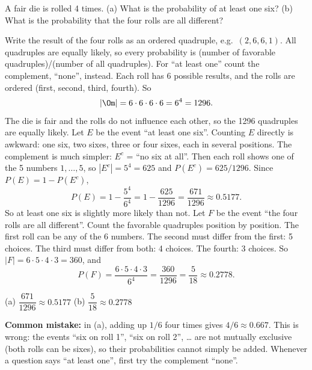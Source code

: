 
\begin{problem}
	A fair die is rolled 4 times. (a) What is the probability of at least one
	six? (b) What is the probability that the four rolls are all different?
\end{problem}

\begin{solution}
	\idea Write the result of the four rolls as an ordered quadruple, e.g.\
	$(2,6,6,1)$. All quadruples are equally likely, so every probability is
	(number of favorable quadruples)/(number of all quadruples). For ``at least
	one'' count the complement, ``none'', instead.
	 Each roll has 6 possible results, and the rolls are
	ordered (first, second, third, fourth). So
	\[ |\Om|=6\cdot6\cdot6\cdot6=6^4=1296. \]
	The die is fair and the rolls do not influence each other, so the 1296
	quadruples are equally likely.
	 Let $E$ be the event ``at least one six''. Counting $E$ directly
	is awkward: one six, two sixes, three or four sixes, each in several
	positions. The complement is much simpler: $E^c$ = ``no six at all''. Then
	each roll shows one of the 5 numbers $1,\dots,5$, so $|E^c|=5^4=625$ and
	$P(E^c)=625/1296$. Since $P(E)=1-P(E^c)$,
	\[ P(E)=1-\frac{5^4}{6^4}=1-\frac{625}{1296}=\frac{671}{1296}\approx0.5177. \]
	So at least one six is slightly more likely than not.
	 Let $F$ be the event ``the four rolls are all different''. Count
	the favorable quadruples position by position. The first roll can be any of
	the 6 numbers. The second must differ from the first: 5 choices. The third
	must differ from both: 4 choices. The fourth: 3 choices. So
	$|F|=6\cdot5\cdot4\cdot3=360$, and
	\[ P(F)=\frac{6\cdot5\cdot4\cdot3}{6^4}=\frac{360}{1296}=\frac{5}{18}\approx0.2778. \]
	\begin{answer}
		(a) $\dfrac{671}{1296}\approx0.5177$ \quad (b) $\dfrac{5}{18}\approx0.2778$
	\end{answer}
	\begin{remark}
		\textbf{Common mistake:} in (a), adding up $1/6$ four times gives
		$4/6\approx0.667$. This is wrong: the events ``six on roll 1'', ``six
		on roll 2'', \dots{} are not mutually exclusive (both rolls can be
		sixes), so their probabilities cannot simply be added. Whenever a
		question says ``at least one'', first try the complement ``none''.
	\end{remark}
\end{solution}
